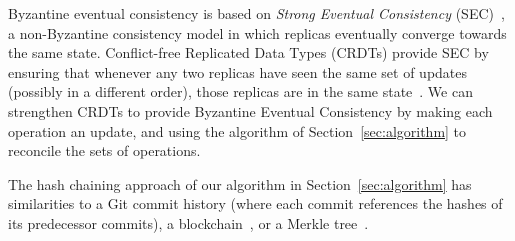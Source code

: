 \documentclass[manuscript,anonymous]{acmart}
\begin{document}

Byzantine eventual consistency is based on \emph{Strong Eventual Consistency} (SEC)~\cite{Shapiro:2011un}, a non-Byzantine consistency model in which replicas eventually converge towards the same state.
Conflict-free Replicated Data Types (CRDTs) provide SEC by ensuring that whenever any two replicas have seen the same set of updates (possibly in a different order), those replicas are in the same state~\cite{Shapiro:2011un}.
We can strengthen CRDTs to provide Byzantine Eventual Consistency by making each operation an update, and using the algorithm of Section~\ref{sec:algorithm} to reconcile the sets of operations.

The hash chaining approach of our algorithm in Section~\ref{sec:algorithm} has similarities to a Git commit history (where each commit references the hashes of its predecessor commits), a blockchain~\cite{Bano:2019}, or a Merkle tree~\cite{Merkle:1987}.






\end{document}
